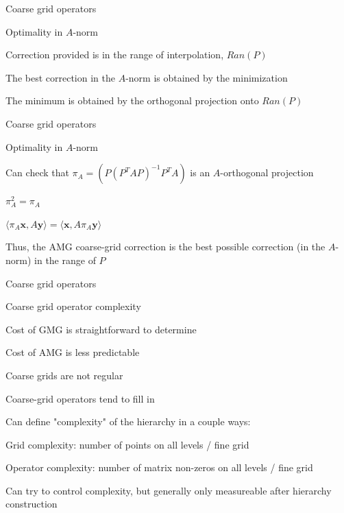 \documentclass[18pt,xcolor=table]{beamer}
\begin{document}
\begin{frame}{Coarse grid operators}
\begin{block}{Optimality in $A$-norm}
\bit
\item Correction provided is in the range of interpolation, $Ran(P)$
\item The best correction in the $A$-norm is obtained by the minimization
\item The minimum is obtained by the orthogonal projection onto $Ran(P)$
\eit
\end{block}
\end{frame}

\begin{frame}{Coarse grid operators}
\begin{block}{Optimality in $A$-norm}
\bit
\item Can check that $\pi_A = (P(P^TAP)^{-1}P^TA)$ is an $A$-orthogonal projection
\bit
\item $\pi_A^2 = \pi_A$
\item $\langle \pi_A \mathbf{x}, A \mathbf{y} \rangle = \langle \mathbf{x}, A \pi_A\mathbf{y} \rangle$
\eit
\item Thus, the AMG coarse-grid correction is the best possible correction (in the $A$-norm) in the range of $P$
\eit
\end{block}
\end{frame}

\begin{frame}{Coarse grid operators}
\begin{block}{Coarse grid operator complexity}
\bit
\item Cost of GMG is straightforward to determine
\item Cost of AMG is less predictable
\bit
\item Coarse grids are not regular
\item Coarse-grid operators tend to fill in
\eit
\item Can define "complexity" of the hierarchy in a couple ways:
\bit
\item Grid complexity: number of points on all levels / fine grid
\item Operator complexity: number of matrix non-zeros on all levels / fine grid
\eit
\item Can try to control complexity, but generally only measureable after hierarchy construction
\eit
\end{block}
\end{frame}
\end{document}
